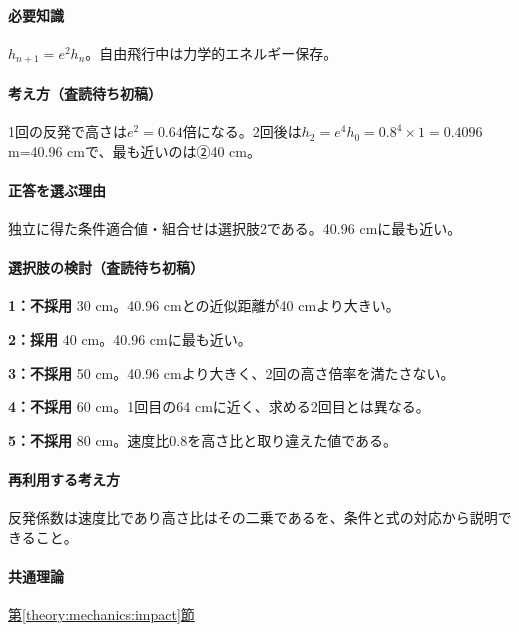 \paragraph{必要知識} \(h_{n+1}=e^2h_n\)。自由飛行中は力学的エネルギー保存。

\paragraph{考え方（査読待ち初稿）} 1回の反発で高さは\(e^2=0.64\)倍になる。2回後は\(h_2=e^4h_0=0.8^4\times1=0.4096\) m=\allowbreak{}40.96 cmで、最も近いのは②40 cm。

\paragraph{正答を選ぶ理由} 独立に得た条件適合値・組合せは選択肢2である。40.96 cmに最も近い。

\paragraph{選択肢の検討（査読待ち初稿）}\mbox{}\par

\noindent\textbf{1：不採用} 30 cm。40.96 cmとの近似距離が40 cmより大きい。\par

\noindent\textbf{2：採用} 40 cm。40.96 cmに最も近い。\par

\noindent\textbf{3：不採用} 50 cm。40.96 cmより大きく、2回の高さ倍率を満たさない。\par

\noindent\textbf{4：不採用} 60 cm。1回目の64 cmに近く、求める2回目とは異なる。\par

\noindent\textbf{5：不採用} 80 cm。速度比0.8を高さ比と取り違えた値である。\par

\paragraph{再利用する考え方} 反発係数は速度比であり高さ比はその二乗であるを、条件と式の対応から説明できること。

\paragraph{共通理論} \hyperref[theory:mechanics:impact]{第\ref*{theory:mechanics:impact}節}

